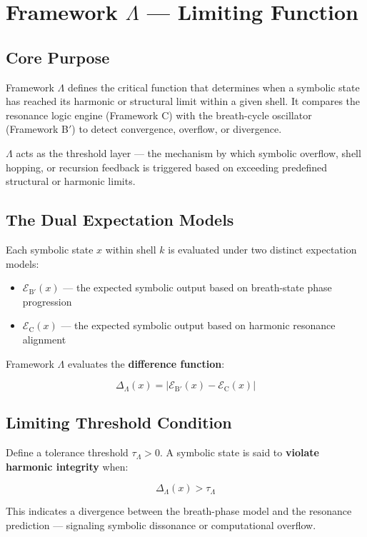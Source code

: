 \section*{Framework $\Lambda$ — Limiting Function}

\subsection*{Core Purpose}

Framework $\Lambda$ defines the critical function that determines when a symbolic state has reached its harmonic or structural limit within a given shell. It compares the resonance logic engine (Framework C) with the breath-cycle oscillator (Framework B$'$) to detect convergence, overflow, or divergence.

$\Lambda$ acts as the threshold layer — the mechanism by which symbolic overflow, shell hopping, or recursion feedback is triggered based on exceeding predefined structural or harmonic limits.

\subsection*{The Dual Expectation Models}

Each symbolic state $x$ within shell $k$ is evaluated under two distinct expectation models:
\begin{itemize}
  \item $\mathcal{E}_{\text{B$'$}}(x)$ — the expected symbolic output based on breath-state phase progression
  \item $\mathcal{E}_{\text{C}}(x)$ — the expected symbolic output based on harmonic resonance alignment
\end{itemize}

Framework $\Lambda$ evaluates the \textbf{difference function}:

\[
\Delta_\Lambda(x) = \left| \mathcal{E}_{\text{B$'$}}(x) - \mathcal{E}_{\text{C}}(x) \right|
\]

\subsection*{Limiting Threshold Condition}

Define a tolerance threshold $\tau_\Lambda > 0$. A symbolic state is said to \textbf{violate harmonic integrity} when:

\[
\Delta_\Lambda(x) > \tau_\Lambda
\]

This indicates a divergence between the breath-phase model and the resonance prediction — signaling symbolic dissonance or computational overflow.

